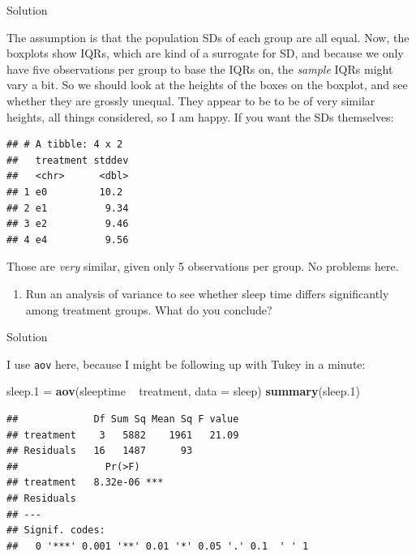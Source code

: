 \documentclass[]{tufte-book}
\newenvironment{Shaded}{}{}
\newcommand{\DataTypeTok}[1]{\textcolor[rgb]{0.56,0.13,0.00}{#1}}
\newcommand{\FloatTok}[1]{\textcolor[rgb]{0.25,0.63,0.44}{#1}}
\newcommand{\KeywordTok}[1]{\textcolor[rgb]{0.00,0.44,0.13}{\textbf{#1}}}
\newcommand{\NormalTok}[1]{#1}
\newcommand{\OperatorTok}[1]{\textcolor[rgb]{0.40,0.40,0.40}{#1}}
\newcommand{\StringTok}[1]{\textcolor[rgb]{0.25,0.44,0.63}{#1}}
\providecommand{\tightlist}{%
  \setlength{\itemsep}{0pt}\setlength{\parskip}{0pt}}
\theoremstyle{definition}
\theoremstyle{definition}
\theoremstyle{definition}
\theoremstyle{remark}
\begin{document}
Solution

The assumption is that the population SDs of each group are all equal.
Now, the boxplots show IQRs, which are kind of a surrogate for SD, and
because we only have five observations per group to base the IQRs on,
the \emph{sample} IQRs might vary a bit. So we should look at the
heights of the boxes on the boxplot, and see whether they are grossly
unequal. They appear to be to be of very similar heights, all things
considered, so I am happy. If you want the SDs themselves:

\begin{Shaded}
\end{Shaded}

\begin{verbatim}
## # A tibble: 4 x 2
##   treatment stddev
##   <chr>      <dbl>
## 1 e0         10.2 
## 2 e1          9.34
## 3 e2          9.46
## 4 e4          9.56
\end{verbatim}

Those are \emph{very} similar, given only 5 observations per group. No
problems here.

\begin{enumerate}
\def\labelenumi{(\alph{enumi})}
\setcounter{enumi}{5}
\tightlist
\item
  Run an analysis of variance to see whether sleep time differs
  significantly among treatment groups. What do you conclude?
\end{enumerate}

Solution

I use \texttt{aov} here, because I might be following up with Tukey in a
minute:

\begin{Shaded}
\begin{Highlighting}[]
\NormalTok{sleep}\FloatTok{.1}\NormalTok{ =}\StringTok{ }\KeywordTok{aov}\NormalTok{(sleeptime }\OperatorTok{~}\StringTok{ }\NormalTok{treatment, }\DataTypeTok{data =}\NormalTok{ sleep)}
\KeywordTok{summary}\NormalTok{(sleep}\FloatTok{.1}\NormalTok{)}
\end{Highlighting}
\end{Shaded}

\begin{verbatim}
##             Df Sum Sq Mean Sq F value
## treatment    3   5882    1961   21.09
## Residuals   16   1487      93        
##               Pr(>F)    
## treatment   8.32e-06 ***
## Residuals               
## ---
## Signif. codes:  
##   0 '***' 0.001 '**' 0.01 '*' 0.05 '.' 0.1  ' ' 1
\end{verbatim}
\end{document}
